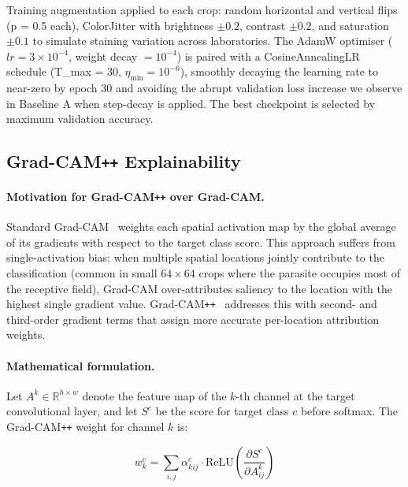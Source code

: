 \documentclass[10pt,twocolumn]{article}
\begin{document}
Training augmentation applied to each crop: random horizontal and vertical
flips (p = 0.5 each), ColorJitter with brightness $\pm 0.2$, contrast
$\pm 0.2$, and saturation $\pm 0.1$ to simulate staining variation across
laboratories. The AdamW optimiser ($lr = 3 \times 10^{-4}$,
weight decay $= 10^{-4}$) is paired with a CosineAnnealingLR schedule
(T\_max = 30, $\eta_{\min} = 10^{-6}$), smoothly decaying the learning
rate to near-zero by epoch 30 and avoiding the abrupt validation loss
increase we observe in Baseline A when step-decay is applied. The best
checkpoint is selected by maximum validation accuracy.

\subsection{Grad-CAM\texttt{++} Explainability}
\label{ssec:gradcam}

\paragraph{Motivation for Grad-CAM\texttt{++} over Grad-CAM.}
Standard Grad-CAM~\cite{selvaraju2017} weights each spatial activation
map by the global average of its gradients with respect to the target class
score. This approach suffers from single-activation bias: when multiple
spatial locations jointly contribute to the classification (common in
small $64 \times 64$ crops where the parasite occupies most of the
receptive field), Grad-CAM over-attributes saliency to the location with
the highest single gradient value. Grad-CAM\texttt{++}~\cite{chattopadhyay2018}
addresses this with second- and third-order gradient terms that assign
more accurate per-location attribution weights.

\paragraph{Mathematical formulation.}
Let $A^k \in \mathbb{R}^{h \times w}$ denote the feature map of the
$k$-th channel at the target convolutional layer, and let $S^c$ be the
score for target class $c$ before softmax. The Grad-CAM\texttt{++} weight
for channel $k$ is:

\begin{equation}
  w_k^c = \sum_{i,j} \alpha_{kij}^c \cdot \text{ReLU}
  \!\left(\frac{\partial S^c}{\partial A_{ij}^k}\right)
  \label{eq:gcampp_weight}
\end{equation}
\end{document}
